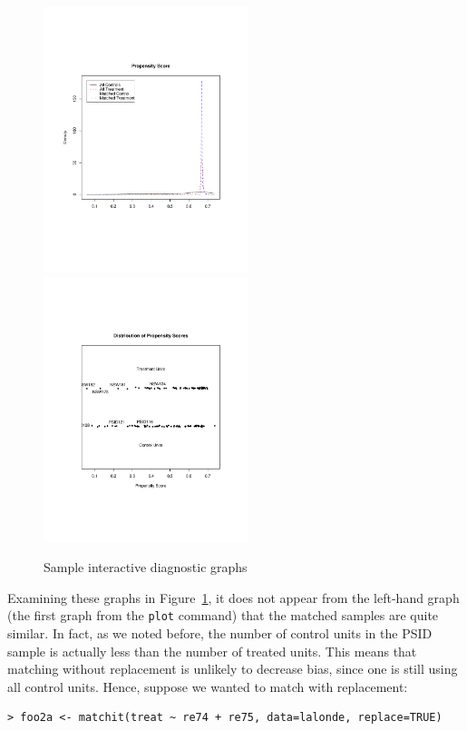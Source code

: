 \documentclass[oneside,letterpaper,titlepage]{article}
\begin{document}
\begin{figure}[h]
  \begin{center}
    \includegraphics[width=2.35in,angle=0]{figs/f2pscore}
    \includegraphics[width=2.35in,angle=0]{figs/f2pjitter}
    \hfill
    \caption{Sample interactive diagnostic graphs}
    \label{f2diags}
  \end{center}
\end{figure}

Examining these graphs in Figure~\ref{f2diags}, it does not appear from the left-hand graph (the first graph from the
\texttt{plot} command) that the matched samples
are quite similar.  In fact, as we noted before, the number of control units in the PSID sample is actually
less than the number of treated units.  This means that matching
without replacement is unlikely to decrease bias, since one is still
using all control units.  Hence, suppose we wanted to match with replacement:

\begin{verbatim}
> foo2a <- matchit(treat ~ re74 + re75, data=lalonde, replace=TRUE)
\end{verbatim} 
\end{document}
